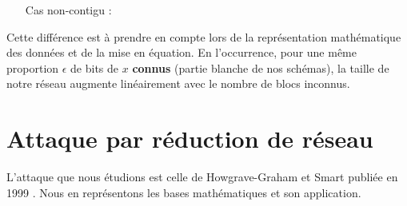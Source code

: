 \documentclass{backend}
\begin{document}
\begin{enumerate}
   \item[Cas non-contigu :]
   \begin{center}
        \smallbreak

        \smallbreak
        
    \end{center}
\end{enumerate}

\bigskip

Cette différence est à prendre en compte lors de la représentation mathématique des données et de la mise en équation. En l’occurrence, pour une même proportion $\epsilon$ de bits de $x$ \textbf{connus} (partie blanche de nos schémas), la taille de notre réseau augmente linéairement avec le nombre de blocs inconnus.




%
%


\newpage
\section{Attaque par réduction de réseau} \label{sec:attaque_signature}

L'attaque que nous étudions est celle de Howgrave-Graham et Smart publiée en 1999 \cite{latAtk}. Nous en représentons les bases mathématiques et son application.
\end{document}
